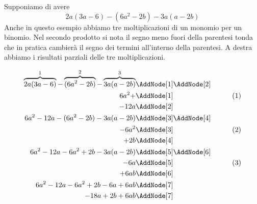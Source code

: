 \begin{esempio}
Supponiamo di avere \[2a(3a-6)-(6a^2-2b)-3a(a-2b)\]
Anche in questo esempio abbiamo tre moltiplicazioni di un monomio per un binomio. Nel secondo prodotto si nota il segno meno fuori della parentesi tonda che in pratica cambierà il segno dei termini all'interno della parentesi. A destra abbiamo  i risultati parziali delle tre moltiplicazioni.
\begin{NodesList}
	\begin{align*}
		\overbrace{2a(3a-6)}^{1}-\overbrace{(6a^2-2b)}^{2}-\overbrace{3a(a-2b)}^{3}&\AddNode[1]\AddNode[2]\\
		6a^2+&\AddNode[1]&\tag{1}\\ 
		-12a&\AddNode[2]&\\
		6a^2-12a-(6a^2-2b)-3a(a-2b)&\AddNode[3]\AddNode[4]\\
		-6a^2&\AddNode[3]&\tag{2}\\    
		+2b&\AddNode[4]&\\
		6a^2-12a-6a^2+2b-3a(a-2b)&\AddNode[5]\AddNode[6]\\
		-6a&\AddNode[5]&\tag{3}\\
		+6ab&\AddNode[6]&\\
		6a^2-12a-6a^2+2b-6a+6ab&\AddNode[7]\\   
		-18a+2b+6ab&\AddNode[7]   
	\end{align*}
\end{NodesList}
\end{esempio}

